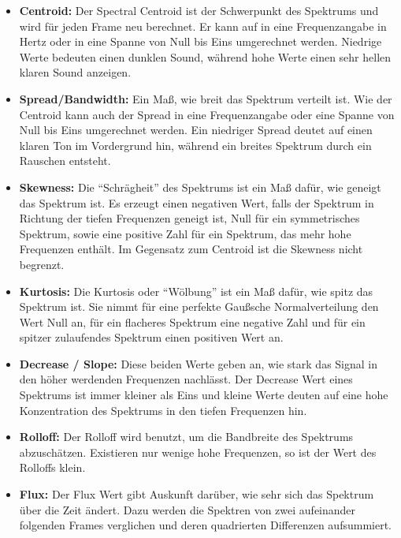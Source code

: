 \documentclass[11pt,a4paper]{article}
\begin{document}
\begin{itemize}
\item \textbf{Centroid:} Der Spectral Centroid ist der Schwerpunkt des Spektrums und wird für jeden Frame neu berechnet. Er kann auf in eine Frequenzangabe in Hertz oder in eine Spanne von Null bis Eins umgerechnet werden. Niedrige Werte bedeuten einen dunklen Sound, während hohe Werte einen sehr hellen klaren Sound anzeigen.

\item \textbf{Spread/Bandwidth:} Ein Maß, wie breit das Spektrum verteilt ist. Wie der Centroid kann auch der Spread in eine Frequenzangabe oder eine Spanne von Null bis Eins umgerechnet werden. Ein niedriger Spread deutet auf einen klaren Ton im Vordergrund hin, während ein breites Spektrum durch ein Rauschen entsteht.

\item \textbf{Skewness:} Die ``Schrägheit'' des Spektrums ist ein Maß dafür, wie geneigt das Spektrum ist. Es erzeugt einen negativen Wert, falls der Spektrum in Richtung der tiefen Frequenzen geneigt ist, Null für ein symmetrisches Spektrum, sowie eine positive Zahl für ein Spektrum, das mehr hohe Frequenzen enthält. Im Gegensatz zum Centroid ist die Skewness nicht begrenzt.

\item \textbf{Kurtosis:} Die Kurtosis oder ``Wölbung'' ist ein Maß dafür, wie spitz das Spektrum ist. Sie nimmt für eine perfekte Gaußsche Normalverteilung den Wert Null an, für ein flacheres Spektrum eine negative Zahl und für ein spitzer zulaufendes Spektrum einen positiven Wert an.

\item \textbf{Decrease / Slope:} Diese beiden Werte geben an, wie stark das Signal in den höher werdenden Frequenzen nachlässt. Der Decrease Wert eines Spektrums ist immer kleiner als Eins und kleine Werte deuten auf eine hohe Konzentration des Spektrums in den tiefen Frequenzen hin.

\item \textbf{Rolloff:} Der Rolloff wird benutzt, um die Bandbreite des Spektrums abzuschätzen. Existieren nur wenige hohe Frequenzen, so ist der Wert des Rolloffs klein.

\item \textbf{Flux:} Der Flux Wert gibt Auskunft darüber, wie sehr sich das Spektrum über die Zeit ändert. Dazu werden die Spektren von zwei aufeinander folgenden Frames verglichen und deren quadrierten Differenzen aufsummiert.


\end{itemize}
\end{document}
